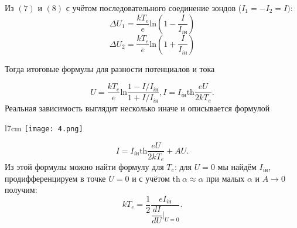 \documentclass[a4paper,12pt]{article}
\begin{document}
Из $(7)$ и $(8)$ с учётом последовательного соединение зондов ($I_1 = -I_2 = I)$:
$$
\Delta U_1= \dfrac{kT_e}{e}\text{ln}\left(1 - \dfrac{I}{I_{i\text{н}}}\right)
$$
$$
\Delta U_2= \dfrac{kT_e}{e}\text{ln}\left(1 + \dfrac{I}{I_{i\text{н}}}\right)
$$

Тогда итоговые формулы для разности потенциалов и тока

\begin{equation}
U = \dfrac{kT_e}{e}\text{ln}\dfrac{1 - I/I_{i\text{н}}}{1 + I/I_{i\text{н}}}, 
I = I_{i\text{н}} \text{th}\dfrac{eU}{2kT_e}.
\end{equation}
Реальная зависимость выглядит несколько иначе и описывается формулой 
\begin{wrapfigure}{l}{7cm}
\texttt{[image: 4.png]}
\vspace{+30pt}
\end{wrapfigure}
\begin{equation}
I = I_{i\text{н}} \text{th}\dfrac{eU}{2kT_e} + AU.
\end{equation}
Из этой формулы можно найти формулу для $T_e$: для $U=0$ мы найдём $I_{i\text{н}}$, продифференцируем в точке $U=0$ и с учётом $\text{th}~\alpha \approx \alpha$ при малых $\alpha$ и $A\rightarrow 0$ получим:
\begin{equation}
kT_e = \dfrac{1}{2}\dfrac{eI_{i\text{н}}}{\dfrac{dI}{dU}|_{U=0}}.
\end{equation}
\end{document}
